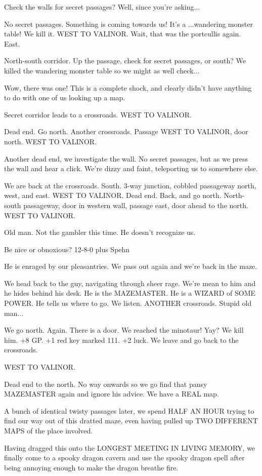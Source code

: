 \documentclass[10pt]{article}
\newcommand{\ps}{ plus Spehn\xspace}
\newcommand{\wtv}{WEST TO VALINOR}
\begin{document}
Check the walls for secret passages?  Well, since you're asking...

No secret passages.  Something is coming towards us!  It's a ...wandering monster table!  We kill it. \wtv.  Wait, that was the portcullis again.  East.

North-south corridor.  Up the passage, check for secret passages, or south?  We killed the wandering monster table so we might as well check...

Wow, there was one!  This is a complete shock, and clearly didn't have anything to do with one of us looking up a map.

Secret corridor leads to a crossroads.  \wtv.

Dead end.  Go north.  Another crossroads.  Passage \wtv, door north.  \wtv.

Another dead end, we investigate the wall.  No secret passages, but as we press the wall and hear a click.  We're dizzy and faint, teleporting us to somewhere else.

We are back at the crossroads.  South.  3-way junction, cobbled passageway north, west, and east.  \wtv.  Dead end.  Back, and go north.  North-south passageway, door in western wall, passage east, door ahead to the north.  \wtv.

Old man.  Not the gambler this time.  He doesn't recognize us.

Be nice or obnoxious? 12-8-0\ps

He is enraged by our pleasantries.  We pass out again and we're back in the maze.

We head back to the guy, navigating through sheer rage.  We're mean to him and he hides behind his desk.  He is the MAZEMASTER.  He is a WIZARD of SOME POWER.  He tells us where to go.  We listen.  ANOTHER crossroads.  Stupid old man...

We go north.  Again.  There is a door.  We reached the minotaur!  Yay?  We kill him.  +8 GP.  +1 red key marked 111.  +2 luck.  We leave and go back to the crossroads.

\wtv.

Dead end to the north.  No way onwards so we go find that pansy MAZEMASTER again and ignore his advice.  We have a REAL map.

A bunch of identical twisty passages later, we spend HALF AN HOUR trying to find our way out of this dratted maze, even having pulled up TWO DIFFERENT MAPS of the place involved. 

Having dragged this onto the LONGEST MEETING IN LIVING MEMORY, we finally come to a spooky dragon cavern and use the spooky dragon spell after being annoying enough to make the dragon breathe fire.
\end{document}
